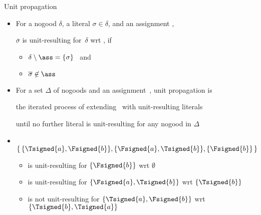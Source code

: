 \begin{frame}{Unit propagation}
  \bigskip
  \begin{itemize}
  \item<2-> For a nogood $\delta$, a literal $\sigma\in\delta$, and an assignment \ass,
    \par\smallskip
    \alert{$\overline{\sigma}$} is \alert{unit-resulting} for~$\delta$ wrt \ass,
    if
    \par\smallskip
    \begin{itemize}\normalsize
    \item $\delta\setminus\ass=\{\sigma\}$
      \ and
    \par\smallskip
    \item $\overline{\sigma}\not\in\ass$
    \end{itemize}
    \smallskip
  \item<3-> For a set $\Delta$ of nogoods and an assignment~\ass,
    \alert{unit propagation} is

    the iterated process of extending \ass\ with unit-resulting literals

    until no further literal is unit-resulting for any nogood in $\Delta$
    \medskip
  \item<only@4->  \
    \(
    \{\,\{\Tsigned{a},\Fsigned{b}\},\{\Fsigned{a},\Tsigned{b}\},\{\Fsigned{b}\}\,\}
    \)
    \begin{itemize}\normalsize
    \item<     5->  is     unit-resulting for $\{\Fsigned{b}\}$ wrt $\emptyset$
    \item<     6-> \Tsigned{a} is     unit-resulting for $\{\Fsigned{a},\Tsigned{b}\}$ wrt $\{\Tsigned{b}\}$
      \smallskip
    \item<only@7->  is not unit-resulting for $\{\Tsigned{a},\Fsigned{b}\}$ wrt $\{\Tsigned{b},\Tsigned{a}\}$
    \end{itemize}
  \end{itemize}
\end{frame}
%
